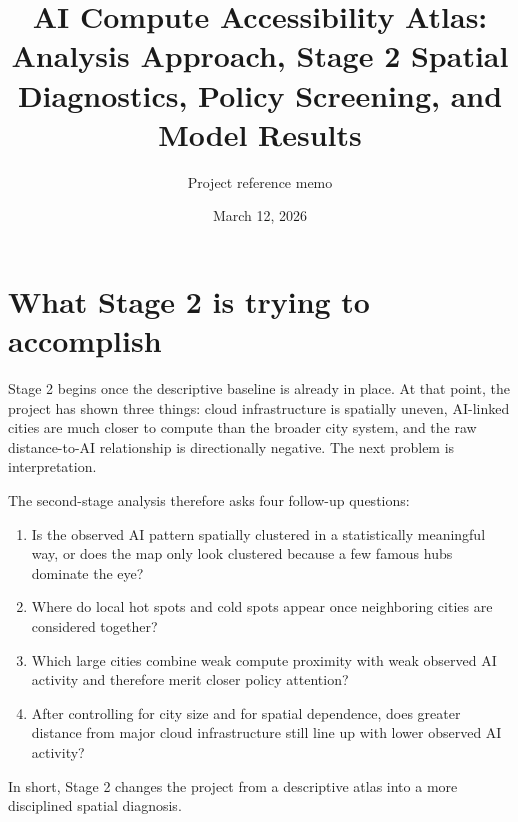 \documentclass[11pt]{article}
\title{\textbf{AI Compute Accessibility Atlas:}\\
\large Analysis Approach, Stage 2 Spatial Diagnostics, Policy Screening, and Model Results}
\author{Project reference memo}
\date{March 12, 2026}
\begin{document}
\maketitle

\begin{center}
\end{center}

\section{What Stage 2 is trying to accomplish}
Stage 2 begins once the descriptive baseline is already in place. At that point, the project has shown three things: cloud infrastructure is spatially uneven, AI-linked cities are much closer to compute than the broader city system, and the raw distance-to-AI relationship is directionally negative. The next problem is interpretation.

The second-stage analysis therefore asks four follow-up questions:
\begin{enumerate}[leftmargin=*]
    \item Is the observed AI pattern spatially clustered in a statistically meaningful way, or does the map only look clustered because a few famous hubs dominate the eye?
    \item Where do local hot spots and cold spots appear once neighboring cities are considered together?
    \item Which large cities combine weak compute proximity with weak observed AI activity and therefore merit closer policy attention?
    \item After controlling for city size and for spatial dependence, does greater distance from major cloud infrastructure still line up with lower observed AI activity?
\end{enumerate}

In short, Stage 2 changes the project from a descriptive atlas into a more disciplined spatial diagnosis.
\end{document}
